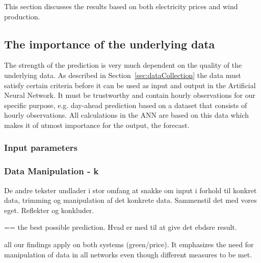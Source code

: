 This section discusses the results based on both electricity prices and wind production.

\subsection{The importance of the underlying data}
The strength of the prediction is very much dependent on the quality of the underlying data. As described in Section~\ref{sec:dataCollection} the data must satisfy certain criteria before it can be used as input and output in the Artificial Neural Network. It must be trustworthy and contain hourly observations for our specific purpose, e.g. day-ahead prediction based on a dataset that consists of hourly observations. All calculations in the ANN are based on this data which makes it of utmost importance for the output, the forecast.


\subsubsection{Input parameters}





\subsubsection{Data Manipulation - k}
De andre tekster undlader i stor omfang at snakke om input i forhold til konkret data, trimming og manipulation af det konkrete data. Sammenstil det med vores eget. Reflekter og konkluder.

== the best possible prediction. Hvad er med til at give det ebdsre result.

all our findings apply on both systems (green/price). It emphasizes the need for manipulation of data in all networks even though different measures to be met.

